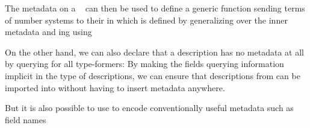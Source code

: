 The metadata on a \  can then be used to define a generic function sending terms of number systems to their  in \bN{}
which is defined by generalizing over the inner metadata and ing using

On the other hand, we can also declare that a description has no metadata at all by querying  for all type-formers:
By making the fields querying information implicit in the type of descriptions, we can ensure that descriptions from  can be imported into  without having to insert metadata anywhere.

But it is also possible to use  to encode conventionally useful metadata such as field names


\begin{comment}
    De definitie van number system (record Meta) is nieuw en hangt vrij
   nauw samen met de universe die je gebruikt. Dat is (deels) te
   begrijpen -- je wilt datastructuren beschrijven als ornaments van
   numbers. Maar nu voelt de presentatie enigsinds backwards -- je
   definieert de Info type die precies past op je descriptions, ipv uit
   te leggen wat een number system is -- een soort specificatie
   opstellen die los staat van de implementatie adhv descriptions. Hoe
   zou je Peano/binary numbers/skew binary numbers/enz beschrijven
   hiermee? En waarom is dit de juiste abstractie voor number systems?
   (En kun je die vraag beantwoorden zonder te refereren aan
   descriptions)

    Re: Ik denk dat de vorm die een getalsysteem kan hebben (i.e., universe), sterk gekoppeld is aan hoe deze geinterpreteerd kan worden, en hoe die geabstraheerd kan worden. Specificaties van ``wat is een getalsysteem'' zijn in die zin vrij fragiel, zouden we pure positional number systems definieren, dan vallen fingertrees buiten de boot, zouden we sparse skew binary numbers willen encoderen, dan moeten we ineens weer reeksen waarden als variabele factoren moeten interpreteren. Daarom denk ik dat een uitleg vanuit de gedachtengang ``we hebben descriptions, en kijk hoe weinig we hoeven aan te passen om daar ook getallen mee te beschrijven'' een betere aanleiding geeft voor wat er later in ieder geval met Info aan zit te komen.
\end{comment}